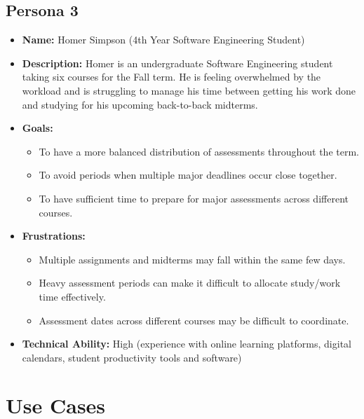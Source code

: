 \documentclass[12pt]{article}
\begin{document}
\subsection{Persona 3}
\begin{itemize}
\item \textbf{Name:} Homer Simpson (4th Year Software Engineering Student)
\item \textbf{Description:} Homer is an undergraduate Software Engineering student taking six courses 
for the Fall term. He is feeling overwhelmed by the workload and is struggling to manage his 
time between getting his work done and studying for his upcoming back-to-back midterms. 
\item \textbf{Goals:}
\begin{itemize}
\item To have a more balanced distribution of assessments throughout the term.
\item To avoid periods when multiple major deadlines occur close together.
\item To have sufficient time to prepare for major assessments across different courses.
\end{itemize}
\item \textbf{Frustrations:}
\begin{itemize}
\item Multiple assignments and midterms may fall within the same few days.
\item Heavy assessment periods can make it difficult to allocate study/work time effectively.
\item Assessment dates across different courses may be difficult to coordinate.
\end{itemize}
\item \textbf{Technical Ability:} High (experience with online learning platforms, digital calendars, student productivity tools and software)
\end{itemize}

\section{Use Cases}
\end{document}
